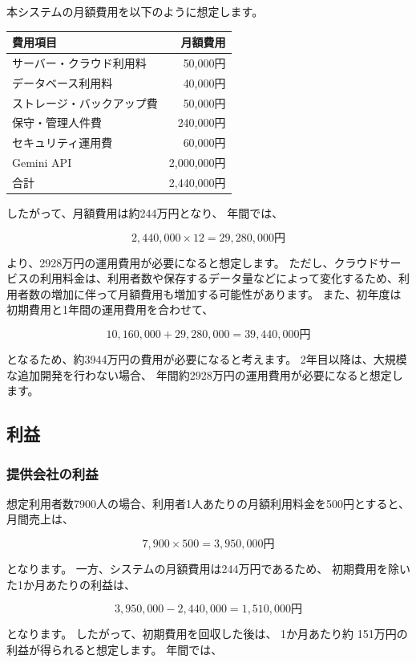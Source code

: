 \documentclass[uplatex,dvipdfmx]{jlreq}
\begin{document}
本システムの月額費用を以下のように想定します。 

\begin{center} 
\begin{tabular}{lr} \hline 
費用項目 & 月額費用 \\ \hline 
サーバー・クラウド利用料 & 50,000円 \\ 
データベース利用料 & 40,000円 \\ 
ストレージ・バックアップ費 & 50,000円 \\ 
保守・管理人件費 & 240,000円 \\ 
セキュリティ運用費 & 60,000円 \\  
Gemini API & 2,000,000円 \\ \hline
合計 & 2,440,000円 \\ \hline 
\end{tabular} 
\end{center} 

したがって、月額費用は約244万円となり、 年間では、

\[
2,440,000 \times 12 = 29,280,000 \text{円}
\]

より、2928万円の運用費用が必要になると想定します。 
ただし、クラウドサービスの利用料金は、利用者数や保存するデータ量などによって変化するため、利用者数の増加に伴って月額費用も増加する可能性があります。
また、初年度は初期費用と1年間の運用費用を合わせて、

\[
10,160,000 + 29,280,000 = 39,440,000 \text{円} 
\]

となるため、約3944万円の費用が必要になると考えます。 2年目以降は、大規模な追加開発を行わない場合、 年間約2928万円の運用費用が必要になると想定します。


\subsection{利益}
\subsubsection{提供会社の利益} 
想定利用者数7900人の場合、利用者1人あたりの月額利用料金を500円とすると、月間売上は、 

\[
7,900 \times 500 =3,950,000\text{円}  
\]

となります。
 一方、システムの月額費用は244万円であるため、 初期費用を除いた1か月あたりの利益は、

\[
3,950,000-2,440,000 = 1,510,000\text{円}
\] 

となります。
したがって、初期費用を回収した後は、 1か月あたり約 151万円の利益が得られると想定します。 
年間では、 
\end{document}
